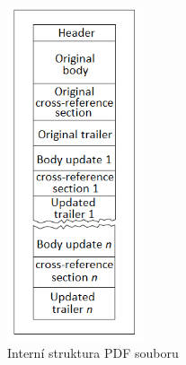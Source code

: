 \begin{figure}[h!]
\centering
\includegraphics[width=4cm]{img/pdf_internal_structure}
\caption{Interní struktura PDF souboru}
\label{fig:pdf_internal_structure}
\end{figure}

